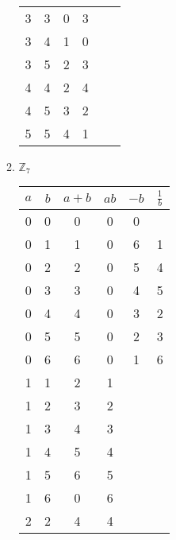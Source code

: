 \documentclass{article}
\begin{document}
\begin{enumerate}
\begin{enumerate}
\begin{table}[H]
\begin{tabular}{|c|c|c|c|c|c|}
                        3 & 3 & 0   & 3   &    &     \\
                        3 & 4 & 1   & 0   &    &     \\
                        3 & 5 & 2   & 3   &    &     \\
                        4 & 4 & 2   & 4   &    &     \\
                        4 & 5 & 3   & 2   &    &     \\
                        5 & 5 & 4   & 1   &    &     \\
                        \hline
                        \end{tabular}
                        \end{table}
                        \item $\mathbb{Z}_7$ \begin{table}[H]
                            \centering
                            \begin{tabular}{|c|c|c|c|c|c|}
                            \hline
                            $a$ & $b$ & $a+b$ & $ab$ & $-b$ & $\frac{1}{b}$ \\
                            \hline
                            0 & 0 & 0   & 0   & 0  &     \\
                            0 & 1 & 1   & 0   & 6  & 1   \\
                            0 & 2 & 2   & 0   & 5  & 4   \\
                            0 & 3 & 3   & 0   & 4  & 5   \\
                            0 & 4 & 4   & 0   & 3  & 2   \\
                            0 & 5 & 5   & 0   & 2  & 3   \\
                            0 & 6 & 6   & 0   & 1  & 6   \\
                            1 & 1 & 2   & 1   &    &     \\
                            1 & 2 & 3   & 2   &    &     \\
                            1 & 3 & 4   & 3   &    &     \\
                            1 & 4 & 5   & 4   &    &     \\
                            1 & 5 & 6   & 5   &    &     \\
                            1 & 6 & 0   & 6   &    &     \\
                            2 & 2 & 4   & 4   &    &     \\

\end{tabular}
\end{table}
\end{enumerate}
\end{enumerate}
\end{document}
